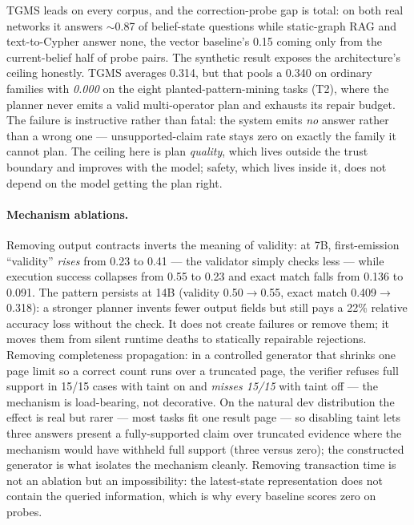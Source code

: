 \documentclass[sigconf]{acmart}
\begin{document}
TGMS leads on every corpus, and the correction-probe gap is total: on
both real networks it answers $\sim$0.87 of belief-state questions while
static-graph RAG and text-to-Cypher answer none, the vector baseline's
0.15 coming only from the current-belief half of probe pairs. The
synthetic result exposes the architecture's ceiling honestly. TGMS
averages 0.314, but that pools a 0.340 on ordinary families with
\emph{0.000} on the eight planted-pattern-mining tasks (T2), where the
planner never emits a valid multi-operator plan and exhausts its repair
budget. The failure is instructive rather than fatal: the system emits
\emph{no} answer rather than a wrong one --- unsupported-claim rate
stays zero on exactly the family it cannot plan. The ceiling here is
plan \emph{quality}, which lives outside the trust boundary and improves
with the model; safety, which lives inside it, does not depend on the
model getting the plan right.

\paragraph{Mechanism ablations.}
Removing output contracts inverts the meaning of validity: at 7B,
first-emission ``validity'' \emph{rises} from 0.23 to 0.41 --- the
validator simply checks less --- while execution success collapses from
0.55 to 0.23 and exact match falls from 0.136 to 0.091. The pattern
persists at 14B (validity 0.50${\to}$0.55, exact match
0.409${\to}$0.318): a stronger planner invents fewer output fields but
still pays a 22\% relative accuracy loss without the check. It does not
create failures or remove them; it moves them from silent runtime deaths
to statically repairable rejections. Removing completeness propagation: in a
controlled generator that shrinks one page limit so a correct count runs
over a truncated page, the verifier refuses full support in 15/15 cases
with taint on and \emph{misses 15/15} with taint off --- the mechanism
is load-bearing, not decorative. On the natural dev distribution the
effect is real but rarer --- most tasks fit one result page --- so
disabling taint lets three answers present a fully-supported claim over
truncated evidence where the mechanism would have withheld full support
(three versus zero); the constructed generator is what isolates the
mechanism cleanly. Removing transaction time is not an ablation but an
impossibility: the latest-state representation does not contain the
queried information, which is why every baseline scores zero on probes.
\end{document}

